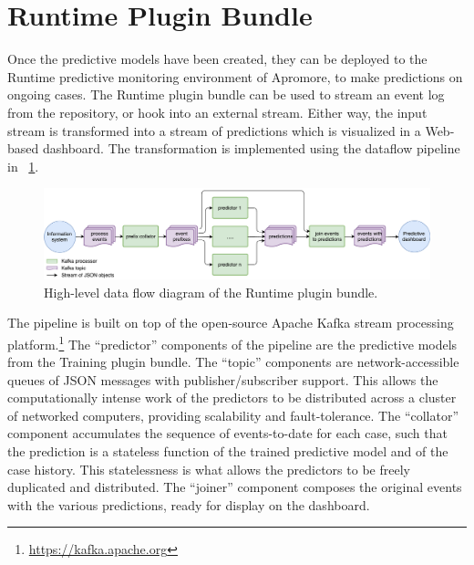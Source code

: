\documentclass[runningheads,a4paper]{llncs}
\begin{document}
\section{Runtime Plugin Bundle} \label{sec:runtime}
Once the predictive models have been created, they can be deployed to the Runtime predictive monitoring environment of Apromore, to make predictions on ongoing cases. The Runtime plugin bundle can be used to stream an event log from the repository, or hook into an external stream. Either way, the input stream is transformed into a stream of predictions which is visualized in a Web-based dashboard. The transformation is implemented using the dataflow pipeline in \figurename~\ref{fig:dfd_0}.
\begin{figure}[htp!]
	\centering
	\includegraphics[width=\textwidth]{img/runtime-dataflow}
	\caption{High-level data flow diagram of the Runtime plugin bundle.}
	\label{fig:dfd_0}
\end{figure}

The pipeline is built on top of the open-source Apache Kafka stream processing platform.\footnote{\url{https://kafka.apache.org}} The ``predictor'' components of the pipeline are the predictive models from the Training plugin bundle. The ``topic'' components are network-accessible queues of JSON messages with publisher/subscriber support. This allows the computationally intense work of the predictors to be distributed across a cluster of networked computers, providing scalability and fault-tolerance.
The ``collator'' component accumulates the sequence of events-to-date for each case, such that the prediction is a stateless function of the trained predictive model and of the case history.  This statelessness is what allows the predictors to be freely duplicated and distributed.  The ``joiner'' component composes the original events with the various predictions, ready for display on the dashboard.
\end{document}
